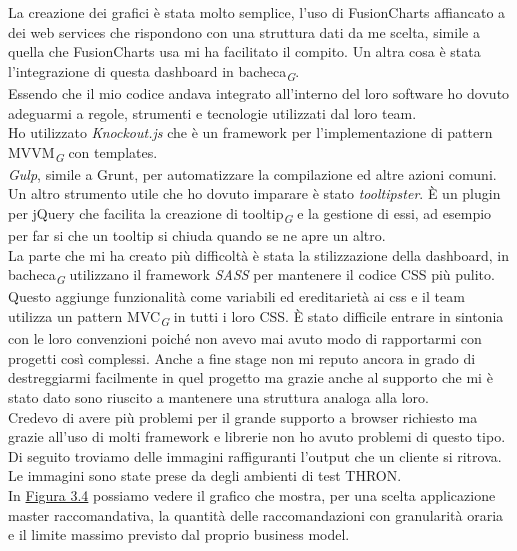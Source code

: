 \documentclass[a4paper, 12pt, twoside, openright]{book}
\newcommand{\gloss}[1]{#1\textsubscript{\textit{\tiny{G}}}}
\begin{document}
La creazione dei grafici è stata molto semplice, l'uso di FusionCharts affiancato a dei web services che rispondono con una struttura dati da me scelta, simile a quella che FusionCharts usa mi ha facilitato il compito. Un altra cosa è stata l'integrazione di questa dashboard in \gloss{bacheca}.\\
Essendo che il mio codice andava integrato all'interno del loro software ho dovuto adeguarmi a regole, strumenti e tecnologie utilizzati dal loro team.\\
Ho utilizzato \textit{Knockout.js} che è un framework per l'implementazione di pattern \gloss{MVVM} con templates.\\
\textit{Gulp}, simile a Grunt, per automatizzare la compilazione ed altre azioni comuni.\\
Un altro strumento utile che ho dovuto imparare è stato \textit{tooltipster}. \`{E} un plugin per jQuery che facilita la creazione di \gloss{tooltip} e la gestione di essi, ad esempio per far si che un tooltip si chiuda quando se ne apre un altro.\\
La parte che mi ha creato più difficoltà è stata la stilizzazione della dashboard, in \gloss{bacheca} utilizzano il framework \textit{SASS} per mantenere il codice CSS più pulito. Questo aggiunge funzionalità come variabili ed ereditarietà ai css e il team utilizza un pattern \gloss{MVC} in tutti i loro CSS. \`{E} stato difficile entrare in sintonia con le loro convenzioni poiché non avevo mai avuto modo di rapportarmi con progetti così complessi. Anche a fine stage non mi reputo ancora in grado di destreggiarmi facilmente in quel progetto ma grazie anche al supporto che mi è stato dato sono riuscito a mantenere una struttura analoga alla loro.\\
Credevo di avere più problemi per il grande supporto a browser richiesto ma grazie all'uso di molti framework e librerie non ho avuto problemi di questo tipo.\\
Di seguito troviamo delle immagini raffiguranti l'output che un cliente si ritrova. Le immagini sono state prese da degli ambienti di test THRON.\\
In \hyperref[grafico-quantitativo]{Figura 3.4} possiamo vedere il grafico che mostra, per una scelta applicazione master raccomandativa, la quantità delle raccomandazioni con granularità oraria e il limite massimo previsto dal proprio business model. 
\end{document}
